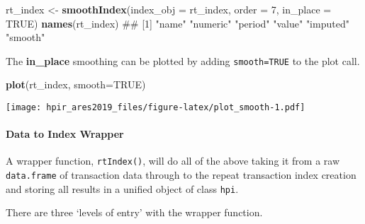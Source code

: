 \documentclass[]{article}
\newenvironment{Shaded}{\begin{snugshade}}{\end{snugshade}}
\newcommand{\DataTypeTok}[1]{\textcolor[rgb]{0.13,0.29,0.53}{#1}}
\newcommand{\DecValTok}[1]{\textcolor[rgb]{0.00,0.00,0.81}{#1}}
\newcommand{\KeywordTok}[1]{\textcolor[rgb]{0.13,0.29,0.53}{\textbf{#1}}}
\newcommand{\NormalTok}[1]{#1}
\newcommand{\OtherTok}[1]{\textcolor[rgb]{0.56,0.35,0.01}{#1}}
\newcommand{\StringTok}[1]{\textcolor[rgb]{0.31,0.60,0.02}{#1}}
\let\oldparagraph\paragraph
\renewcommand{\paragraph}[1]{\oldparagraph{#1}\mbox{}}
\begin{document}
\begin{Shaded}
\begin{Highlighting}[]
\NormalTok{   rt_index <-}\StringTok{ }\KeywordTok{smoothIndex}\NormalTok{(}\DataTypeTok{index_obj =}\NormalTok{ rt_index,}
                           \DataTypeTok{order =} \DecValTok{7}\NormalTok{,}
                           \DataTypeTok{in_place =} \OtherTok{TRUE}\NormalTok{)}
   \KeywordTok{names}\NormalTok{(rt_index)}
\NormalTok{## [1] "name"    "numeric" "period"  "value"   "imputed" "smooth"}
\end{Highlighting}
\end{Shaded}

The \textbf{in\_place} smoothing can be plotted by adding
\texttt{smooth=TRUE} to the plot call.

\begin{Shaded}
\begin{Highlighting}[]
   \KeywordTok{plot}\NormalTok{(rt_index, }\DataTypeTok{smooth=}\OtherTok{TRUE}\NormalTok{)}
\end{Highlighting}
\end{Shaded}

\texttt{[image: hpir\_ares2019\_files/figure-latex/plot\_smooth-1.pdf]}

\hypertarget{data-to-index-wrapper}{%
\paragraph{Data to Index Wrapper}\label{data-to-index-wrapper}}

A wrapper function, \texttt{rtIndex()}, will do all of the above taking
it from a raw \texttt{data.frame} of transaction data through to the
repeat transaction index creation and storing all results in a unified
object of class \texttt{hpi}.

There are three `levels of entry' with the wrapper function.
\end{document}
